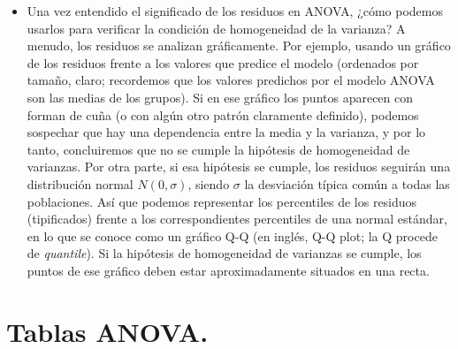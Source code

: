 \begin{itemize}
    \item Una vez entendido el significado de los residuos en ANOVA, ¿cómo podemos usarlos para verificar la condición de homogeneidad de la varianza? A menudo, los residuos se analizan gráficamente. Por ejemplo, usando un gráfico de los residuos frente a los valores que predice el modelo (ordenados por tamaño, claro; recordemos que los valores predichos por el modelo ANOVA son las medias de los grupos). Si en ese gráfico los puntos aparecen con forman de cuña (o con algún otro patrón claramente definido), podemos sospechar que hay una dependencia entre la media y la varianza, y por lo tanto, concluiremos que no se cumple la hipótesis de homogeneidad de varianzas. Por otra parte, si esa hipótesis se cumple, los residuos seguirán una distribución normal $N(0,\sigma)$, siendo $\sigma$ la desviación típica común a todas las poblaciones. Así que podemos representar los percentiles de los residuos (tipificados) frente a los correspondientes percentiles de una normal estándar, en lo que se conoce como un gráfico Q-Q (en inglés, Q-Q plot; la Q procede de {\em quantile}). Si la hipótesis de homogeneidad de varianzas se cumple, los puntos de ese gráfico deben estar aproximadamente situados en una recta.

\end{itemize}


\section{Tablas ANOVA.}

